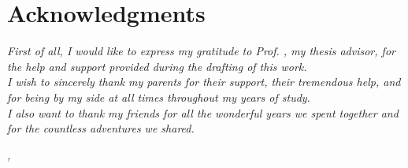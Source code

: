 \clearpage
{}
{}

\begingroup
\let\clearpage\relax
\let\cleardoublepage\relax
\let\cleardoublepage\relax

\chapter*{Acknowledgments}

\noindent \textit{First of all, I would like to express my gratitude to Prof. \myProf, my thesis advisor, for the help and support provided during the drafting of this work.}\\

\noindent \textit{I wish to sincerely thank my parents for their support, their tremendous help, and for being by my side at all times throughout my years of study.}\\

\noindent \textit{I also want to thank my friends for all the wonderful years we spent together and for the countless adventures we shared.}\\
\bigskip

\noindent\textit{\myLocation, \myTime}
\hfill \myName

\endgroup
